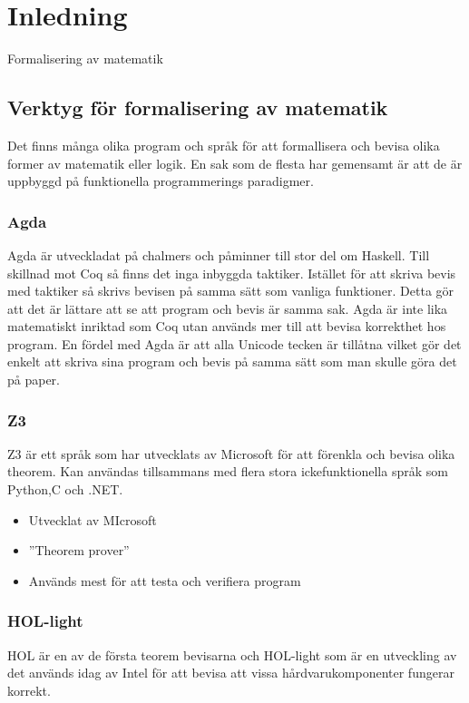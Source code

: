 \section{Inledning}
Formalisering av matematik

\subsection{Verktyg för formalisering av matematik}
Det finns många olika program och språk för att formallisera och bevisa
olika former av matematik eller logik. En sak som de flesta har gemensamt är
att de är uppbyggd på funktionella programmerings paradigmer.

\subsubsection{Agda}
Agda är utveckladat på chalmers och påminner till stor del om Haskell. Till
skillnad mot Coq så finns det inga inbyggda taktiker. Istället för att skriva
bevis med taktiker så skrivs bevisen på samma sätt som vanliga funktioner.
Detta gör att det är lättare att se att program och bevis är samma sak. Agda är
inte lika matematiskt inriktad som Coq utan används mer till att bevisa
korrekthet hos program. En fördel med Agda är att alla Unicode tecken är
tillåtna vilket gör det enkelt att skriva sina program och bevis på samma sätt
som man skulle göra det på paper.

\subsubsection{Z3}
Z3 är ett språk som har utvecklats av Microsoft för att förenkla och bevisa
olika theorem. Kan användas tillsammans med flera stora ickefunktionella språk
som Python,C och .NET.

\begin{itemize}
  \item Utvecklat av MIcrosoft
  \item ''Theorem prover''
  \item Används mest för att testa och verifiera program
\end{itemize}

\subsubsection{HOL-light}
HOL är en av de första teorem bevisarna och HOL-light som är en utveckling av
det används idag av Intel för att bevisa att vissa hårdvarukomponenter fungerar
korrekt.

